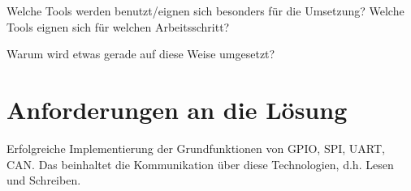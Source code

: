 Welche Tools werden benutzt/eignen sich besonders für die Umsetzung?
Welche Tools eignen sich für welchen Arbeitsschritt?

Warum wird etwas gerade auf diese Weise umgesetzt?


\section{Anforderungen an die Lösung}
Erfolgreiche Implementierung der Grundfunktionen 
von GPIO, SPI, UART, CAN. Das beinhaltet die Kommunikation über diese Technologien, d.h. Lesen und Schreiben.


